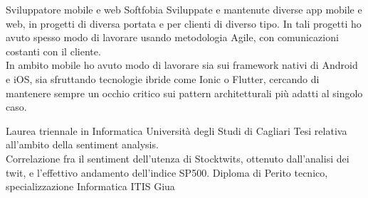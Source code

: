 \documentclass[
	a4paper,
]{fortysecondscv}
\begin{document}
\makefrontsidebar

\begin{cvtable}[3]
        {Sviluppatore mobile e web}
        {Softfobia}
        {Sviluppate e mantenute diverse app mobile e web, in progetti di diversa portata e per clienti di diverso tipo. In tali progetti ho avuto spesso modo di lavorare usando metodologia Agile, con comunicazioni costanti con il cliente.\\
        In ambito mobile ho avuto modo di lavorare sia sui framework nativi di Android e iOS, sia sfruttando tecnologie ibride come Ionic o Flutter, cercando di mantenere sempre un occhio critico sui pattern architetturali più adatti al singolo caso.}
\end{cvtable}


\begin{cvtable}[2]
        {Laurea triennale in Informatica}
        {Università degli Studi di Cagliari}
        {Tesi relativa all'ambito della sentiment analysis.\\ Correlazione fra il sentiment dell'utenza di Stocktwits, ottenuto dall'analisi dei twit, e l'effettivo andamento dell'indice SP500.}
        {Diploma di Perito tecnico, specializzazione Informatica}
        {ITIS Giua}
        {\\}
\end{cvtable}
\end{document}

